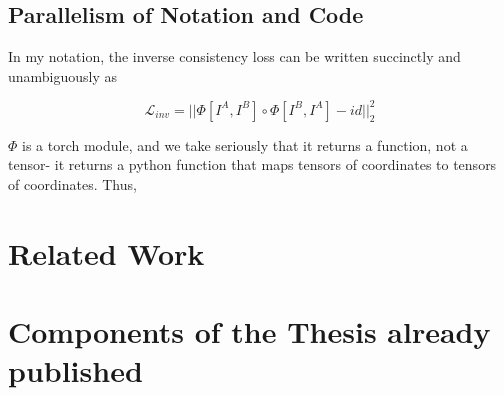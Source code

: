 \documentclass{article}
\begin{document}
\subsection{Parallelism of Notation and Code}

In my notation, the inverse consistency loss can be written succinctly and
unambiguously as

$$ \mathcal{L}_{inv} = ||\Phi[I^A, I^B] \circ \Phi[I^B, I^A] - id||^2_2$$

$\Phi$ is a torch module, and we take seriously that it returns a function, not a tensor- it returns a python function that maps tensors of coordinates to tensors of coordinates. Thus,

\section{Related Work}

\cite{Mok_2020_CVPR, iglesias2023easyreg}

\section{Components of the Thesis already published}
\end{document}
